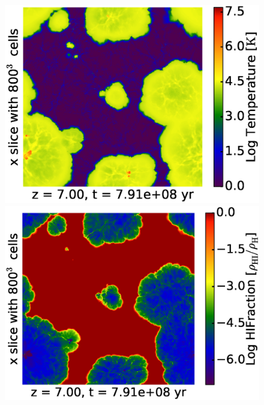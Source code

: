 \begin{figure}[!tp]
\begin{minipage}[h]{0.33\linewidth}
	\includegraphics[trim = 10mm 0mm 7mm 7mm, clip, width=1.0\textwidth]{2_2_slice_Temperature_x_HD7900.eps}
	\end{minipage}
\hspace*{-2.00mm}
	\begin{minipage}[h]{0.33\linewidth}
	\centering
	\includegraphics[trim = 10mm 0mm 7mm 7mm, clip, width=1.0\textwidth]{2_3_slice_HIFraction_x_HD7900.eps}
	\end{minipage}
\vspace*{-2.00mm}\\
	\begin{minipage}[h]{0.33\linewidth}
	\centering

\end{minipage}
\end{figure}
